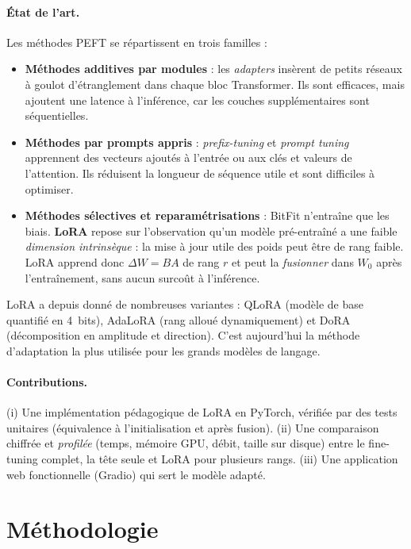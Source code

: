 \documentclass[11pt,a4paper]{article}
\begin{document}
\paragraph{État de l'art.} Les méthodes PEFT \cite{mangrulkar2022peft} se répartissent en trois familles :
\begin{itemize}
\item \textbf{Méthodes additives par modules} : les \emph{adapters} \cite{houlsby2019} insèrent de petits réseaux à goulot d'étranglement dans chaque bloc Transformer. Ils sont efficaces, mais ajoutent une latence à l'inférence, car les couches supplémentaires sont séquentielles.
\item \textbf{Méthodes par prompts appris} : \emph{prefix-tuning} \cite{li2021prefix} et \emph{prompt tuning} \cite{lester2021} apprennent des vecteurs ajoutés à l'entrée ou aux clés et valeurs de l'attention. Ils réduisent la longueur de séquence utile et sont difficiles à optimiser.
\item \textbf{Méthodes sélectives et reparamétrisations} : BitFit \cite{benzaken2021} n'entraîne que les biais. \textbf{LoRA} \cite{hu2021lora} repose sur l'observation qu'un modèle pré-entraîné a une faible \emph{dimension intrinsèque} \cite{aghajanyan2020} : la mise à jour utile des poids peut être de rang faible. LoRA apprend donc $\Delta W = BA$ de rang $r$ et peut la \emph{fusionner} dans $W_0$ après l'entraînement, sans aucun surcoût à l'inférence.
\end{itemize}
LoRA a depuis donné de nombreuses variantes : QLoRA \cite{dettmers2023qlora} (modèle de base quantifié en 4~bits), AdaLoRA \cite{zhang2023adalora} (rang alloué dynamiquement) et DoRA \cite{liu2024dora} (décomposition en amplitude et direction). C'est aujourd'hui la méthode d'adaptation la plus utilisée pour les grands modèles de langage.

\paragraph{Contributions.} (i) Une implémentation pédagogique de LoRA en PyTorch, vérifiée par des tests unitaires (équivalence à l'initialisation et après fusion). (ii) Une comparaison chiffrée et \emph{profilée} (temps, mémoire GPU, débit, taille sur disque) entre le fine-tuning complet, la tête seule et LoRA pour plusieurs rangs. (iii) Une application web fonctionnelle (Gradio) qui sert le modèle adapté.

\section{Méthodologie}
\end{document}
